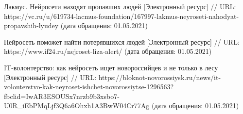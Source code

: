 \begin{thebibliography}{00}
    Лакмус. Нейросети находят пропавших людей
    [Электронный ресурс] //
    URL: https://vc.ru/u/619734-lacmus-foundation/167997-lakmus-neyroseti-nahodyat-propavshih-lyudey
    (дата обращения: 01.05.2021)
    
    Нейросеть поможет найти потерявшихся людей
    [Электронный ресурс] //
    URL: https://www.if24.ru/nejroset-liza-alert/
    (дата обращения: 01.05.2021)

    IT-волонтерство: как нейросеть ищет новороссийцев и не только в лесу
    [Электронный ресурс] //
    URL: https://bloknot-novorossiysk.ru/news/it-volonterstvo-kak-neyroset-ishchet-novorossiytse-1296563?fbclid=IwAR3ESOUSx7nrzb9b3xsbo7-U0R\_iEbPMqLjf3Q6a6Ohxh1A3BwW04Cr77Ag
    (дата обращения: 01.05.2021)

\end{thebibliography}
\endgroup

\clearpage